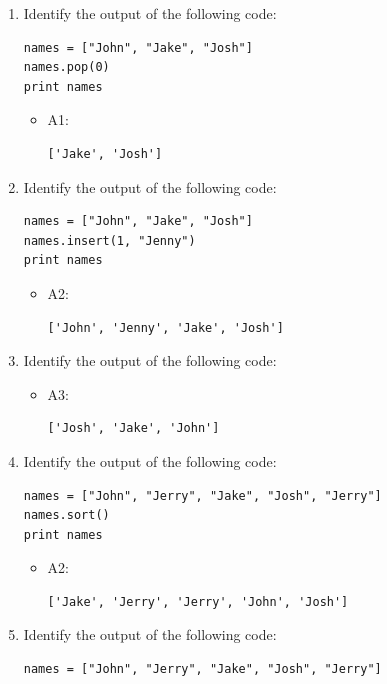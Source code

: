 \documentclass[article,A4,12pt]{llncs}
\begin{document}
\begin{enumerate}
  \begin{itemize}
    \item A1:
\begin{verbatim}
['John', 'Jake', 'Josh', 'Jerry']
\end{verbatim}
  \end{itemize}
\item Identify the output of the following code:
\begin{verbatim}
names = ["John", "Jake", "Josh"]
names.pop(0)
print names
\end{verbatim}
  \begin{itemize}
    \item A1:
\begin{verbatim}
['Jake', 'Josh']
\end{verbatim}
  \end{itemize}
\item Identify the output of the following code:
\begin{verbatim}
names = ["John", "Jake", "Josh"]
names.insert(1, "Jenny")
print names
\end{verbatim}
  \begin{itemize}
    \item A2:
\begin{verbatim}
['John', 'Jenny', 'Jake', 'Josh']
\end{verbatim}
  \end{itemize}
\item Identify the output of the following code:
  \begin{itemize}
    \item A3:
\begin{verbatim}
['Josh', 'Jake', 'John']
\end{verbatim}
  \end{itemize}
\item Identify the output of the following code:
\begin{verbatim}
names = ["John", "Jerry", "Jake", "Josh", "Jerry"]
names.sort()
print names
\end{verbatim}
  \begin{itemize}
    \item A2:
\begin{verbatim}
['Jake', 'Jerry', 'Jerry', 'John', 'Josh']
\end{verbatim}
  \end{itemize}
\item Identify the output of the following code:
\begin{verbatim}
names = ["John", "Jerry", "Jake", "Josh", "Jerry"]

\end{verbatim}
\end{enumerate}
\end{document}
